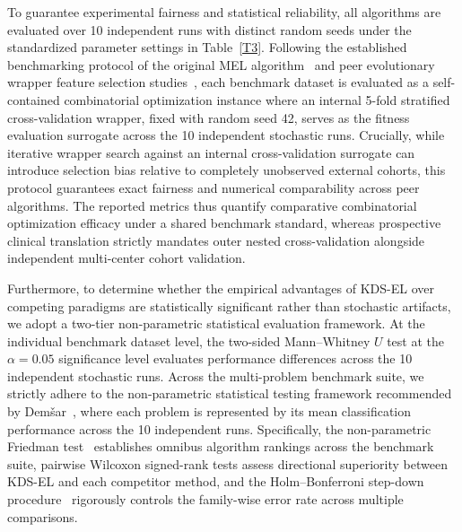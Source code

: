 To guarantee experimental fairness and statistical reliability, all algorithms are evaluated over 10 independent runs with distinct random seeds under the standardized parameter settings in Table~\ref{T3}. Following the established benchmarking protocol of the original MEL algorithm~\cite{mel2024} and peer evolutionary wrapper feature selection studies~\cite{wangjia2022,wei2025}, each benchmark dataset is evaluated as a self-contained combinatorial optimization instance where an internal 5-fold stratified cross-validation wrapper, fixed with random seed 42, serves as the fitness evaluation surrogate across the 10 independent stochastic runs. Crucially, while iterative wrapper search against an internal cross-validation surrogate can introduce selection bias relative to completely unobserved external cohorts, this protocol guarantees exact fairness and numerical comparability across peer algorithms. The reported metrics thus quantify comparative combinatorial optimization efficacy under a shared benchmark standard, whereas prospective clinical translation strictly mandates outer nested cross-validation alongside independent multi-center cohort validation.

Furthermore, to determine whether the empirical advantages of KDS-EL over competing paradigms are statistically significant rather than stochastic artifacts, we adopt a two-tier non-parametric statistical evaluation framework. At the individual benchmark dataset level, the two-sided Mann--Whitney $U$ test at the $\alpha = 0.05$ significance level evaluates performance differences across the 10 independent stochastic runs. Across the multi-problem benchmark suite, we strictly adhere to the non-parametric statistical testing framework recommended by Dem{\v{s}}ar~\cite{demsar2006}, where each problem is represented by its mean classification performance across the 10 independent runs. Specifically, the non-parametric Friedman test~\cite{friedman1940} establishes omnibus algorithm rankings across the benchmark suite, pairwise Wilcoxon signed-rank tests assess directional superiority between KDS-EL and each competitor method, and the Holm--Bonferroni step-down procedure~\cite{holm1979} rigorously controls the family-wise error rate across multiple comparisons.
